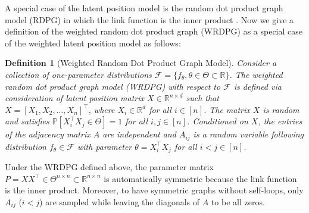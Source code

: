 \documentclass[a4paper]{article}
\newtheorem{definition}[fact]{Definition}
\begin{document}
A special case of the latent position model is the random dot product graph model (RDPG) in which the link function is the inner product \citep{young2007random, nickel2008random}. Now we give a definition of the weighted random dot product graph (WRDPG) as a special case of the weighted latent position model as follows:
\begin{definition}[Weighted Random Dot Product Graph Model]
Consider a collection of one-parameter distributions $\mathcal{F} = \{ f_{\theta}, \theta \in \Theta \subset \mathbb{R} \}$. The weighted random dot product graph model (WRDPG) with respect to $\mathcal{F}$ is defined via consideration of latent position matrix $X \in \mathbb{R}^{n \times d}$ such that $X = [X_1, X_2, \dotsc, X_n]^{\top}$, where $X_i \in \mathbb{R}^d$ for all $i \in [n]$. The matrix $X$ is random and satisfies $\mathbb{P}\left[ X_i^{\top} X_j \in \Theta \right] = 1$ for all $i, j \in [n]$. Conditioned on $X$, the entries of the adjacency matrix $A$ are independent and $A_{ij}$ is a random variable following distribution $f_{\theta} \in \mathcal{F}$ with parameter $\theta = X_i^{\top} X_j $ for all $i < j \in [n]$.
\end{definition}
Under the WRDPG defined above, the parameter matrix $P = X X^{\top} \in \Theta^{n \times n} \subset \mathbb{R}^{n \times n}$ is automatically symmetric because the link function is the inner product. Moreover, to have symmetric graphs without self-loops, only $A_{ij}$ ($i < j$) are sampled while leaving the diagonals of $A$ to be all zeros.

\end{document}
